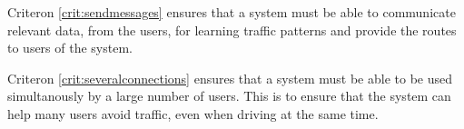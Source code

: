 Criteron \ref{crit:sendmessages} ensures that a system must be able to communicate relevant data, from the users, for learning traffic patterns and provide the routes to users of the system.

Criteron \ref{crit:severalconnections} ensures that a system must be able to be used simultanously by a large number of users. This is to ensure that the system can help many users avoid traffic, even when driving at the same time.



